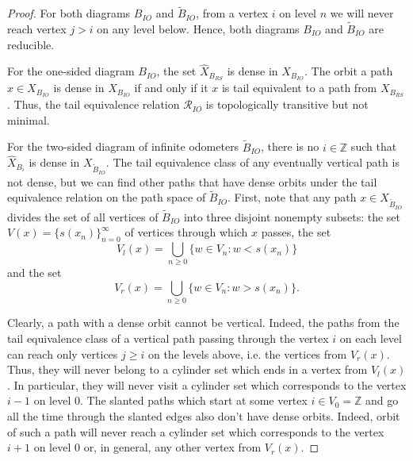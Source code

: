\documentclass[11pt, twoside]{amsart}
\theoremstyle{definition}
\theoremstyle{remark}
\theoremstyle{plain}
\def\tl{\widetilde}
\def\wh{\widehat}
\newcommand{\Z}{\mathbb Z}
\numberwithin{equation}{section}
\begin{document}
\begin{proof}
For both diagrams $B_{IO}$ and $\tl B_{IO}$, from a vertex $i$ on level $n$ we will never reach vertex $j > i$ on any level below. Hence, both diagrams $B_{IO}$ and $\tl B_{IO}$ are reducible.

For the one-sided diagram $B_{IO}$, 
the set $\wh{X}_{B_{RS}}$ is dense in $X_{B_{IO}}$. The orbit a path $x \in X_{B_{IO}}$ is dense in $X_{B_{IO}}$ if and only if it $x$ is tail equivalent to a path from $X_{B_{RS}}$. Thus, the tail equivalence relation $\mathcal{R}_{IO}$ is topologically transitive but not minimal.


For the two-sided diagram of infinite odometers $\tl B_{IO}$, there is no $i \in \Z$ such that $\wh{X}_{B_i}$ is dense in $X_{\tl B_{IO}}$. The tail equivalence class of any eventually vertical path is not dense, but we can find other paths that have dense orbits under the tail equivalence relation on the path space of $\tl B_{IO}$. 
First, note that any path $x \in X_{\tl B_{IO}}$ divides the set of all vertices of $\tl B_{IO}$ into three disjoint nonempty subsets: the set $V(x) = \{s(x_n)\}_{n = 0}^{\infty}$ of vertices through which $x$ passes, the set 
$$V_{l}(x) = \bigcup_{n \geq 0}\{w \in V_n : w < s(x_n)\}$$ 
and the set 
$$V_{r}(x) = \bigcup_{n \geq 0}\{w \in V_n : w > s(x_n)\}.$$ 

Clearly, a path with a dense orbit cannot be vertical. Indeed, the paths from the tail equivalence class of a vertical path passing through the vertex $i$ on each level can reach only vertices $j \geq i$ on the levels above, i.e. the vertices from $V_r(x)$. Thus, they will never belong to a cylinder set which ends in a vertex from $V_l(x)$. In particular, they will never visit a cylinder set which corresponds to the vertex $i - 1$ on level $0$. 
     The slanted paths which start at some vertex $i \in V_0 = \Z$ and go all the time through the slanted edges also don't have dense orbits. Indeed, orbit of such a path will never reach a cylinder set which corresponds to the vertex $i+1$ on level $0$ or, in general, any other vertex from $V_r(x)$.
     

\end{proof}
\end{document}

